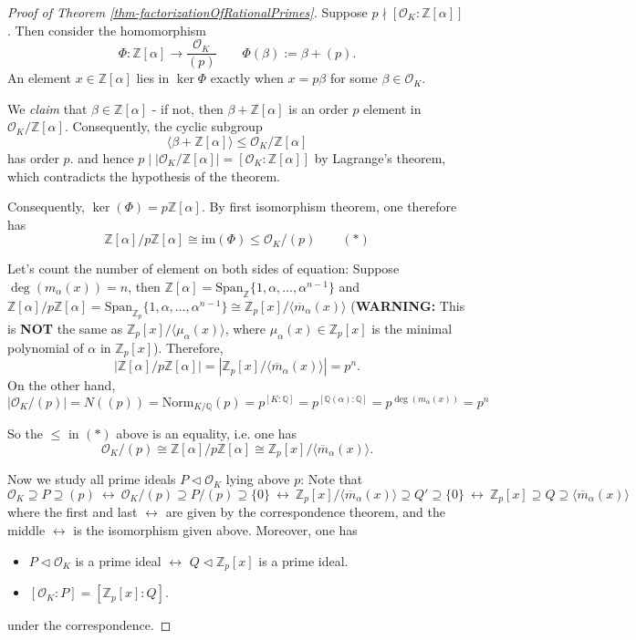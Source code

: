 \begin{proof}[Proof of Theorem \ref{thm-factorizationOfRationalPrimes}]
Suppose $ p \nmid [\mathcal{O}_K : \mathbb{Z}[\alpha]]$. Then consider the homomorphism
$$
\Phi: \mathbb{Z}[\alpha] \longrightarrow \frac{\mathcal{O}_K}{(p)} \quad \quad \Phi(\beta):= \beta + (p).
$$
An element $x\in\mathbb{Z}[\alpha]$ lies in $\ker\Phi$ exactly when $x=p\beta$ for some $\beta\in\mathcal{O}_K$.

We \textit{claim} that $\beta \in \mathbb{Z}[\alpha]$ - if not, then
$\beta + \mathbb{Z}[\alpha]$ is an order $p$ element in $\mathcal{O}_K/\mathbb{Z}[\alpha]$. Consequently, the cyclic subgroup
$$\langle \beta + \mathbb{Z}[\alpha] \rangle \leq \mathcal{O}_K/\mathbb{Z}[\alpha]$$ 
has order $p$. and hence $ p \mid \left|\mathcal{O}_K/\mathbb{Z}[\alpha]\right| = [\mathcal{O}_K : \mathbb{Z}[\alpha]]$ by Lagrange's theorem, which contradicts the hypothesis of the theorem.

\medskip
Consequently, $\ker(\Phi) = p\mathbb{Z}[\alpha]$. By first isomorphism theorem, one therefore has
$$\mathbb{Z}[\alpha]/ p \mathbb{Z}[\alpha] \cong \mathrm{im}(\Phi) \leq \mathcal{O}_K/(p)  \quad \quad   (*)$$

Let's count the number of element on both sides of equation: Suppose $\deg(m_{\alpha}(x)) = n$, then $\mathbb{Z}[\alpha] = \text{Span}_{\mathbb{Z}} \{1, \alpha, \ldots, \alpha^{n-1}\}$
and $\mathbb{Z}[\alpha]/p\mathbb{Z}[\alpha] = \text{Span}_{\mathbb{Z}_p} \{1, \alpha, \ldots, \alpha^{n-1}\} \cong  \mathbb{Z}_p[x]/\langle \overline{m}_{\alpha}(x)\rangle$ ({\bf WARNING:} This is {\bf NOT} the same as $\mathbb{Z}_p[x]/\langle\mu_{\alpha}(x)\rangle$, where $\mu_{\alpha}(x) \in \mathbb{Z}_p[x]$ is the minimal polynomial of $\alpha$ in $\mathbb{Z}_p[x]$). Therefore, 
$$|\mathbb{Z}[\alpha]/p\mathbb{Z}[\alpha]| = | \mathbb{Z}_p[x]/\langle \overline{m}_{\alpha}(x)\rangle| = p^n.$$
On the other hand, 
$$|\mathcal{O}_K/(p)| = N((p)) = \mathrm{Norm}_{K/\mathbb{Q}}(p) = p^{[K:\mathbb{Q}]} = p^{[\mathbb{Q}(\alpha):\mathbb{Q}]} = p^{\deg(m_{\alpha}(x))} = p^n$$

So the $\leq$ in $(*)$ above is an equality, i.e. one has $$\mathcal{O}_K/(p) \cong \mathbb{Z}[\alpha]/p\mathbb{Z}[\alpha] \cong  \mathbb{Z}_p[x]/\langle \overline{m}_{\alpha}(x)\rangle.$$

Now we study all prime ideals $P \lhd \mathcal{O}_K$ lying above $p$: Note that
$$\mathcal{O}_K \supseteq P \supseteq (p) 
\ \leftrightarrow \ \mathcal{O}_K/(p) \supseteq P/(p) \supseteq \{0\} \ \leftrightarrow \ \mathbb{Z}_p[x]/\langle \overline{m}_{\alpha}(x)\rangle \supseteq Q' \supseteq \{0\} \ \leftrightarrow \  \mathbb{Z}_p[x] \supseteq Q \supseteq \langle \overline{m}_{\alpha}(x)\rangle$$
where the first and last $\leftrightarrow$ are given by the correspondence theorem, and the middle $\leftrightarrow$ is the isomorphism given above. Moreover, one has
\begin{itemize}
    \item $P \lhd \mathcal{O}_K$ is a prime ideal $\leftrightarrow$ $Q \lhd \mathbb{Z}_p[x]$ is a prime ideal. 
    \item $[\mathcal{O}_K:P] = [\mathbb{Z}_p[x]: Q]$.
\end{itemize}
under the correspondence.


\end{proof}
